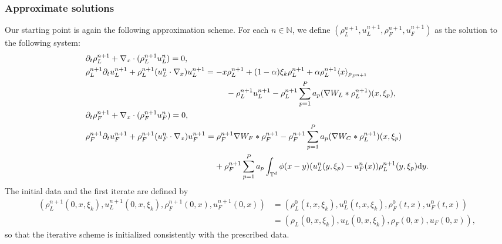\documentclass[10pt, reqno]{amsart}
\theoremstyle{definition}
\theoremstyle{remark}
\numberwithin{equation}{section}
\newcommand{\dy}{\textnormal{d}y}
\newcommand{\bbN}{\mathbb N}
\newcommand{\T}{\mathbb{T}}
\newcommand{\p}{\partial}
\begin{document}
\subsubsection{Approximate solutions} Our starting point is again the following approximation scheme. For each $n\in \bbN$, we define $(\rho_L^{n+1}, u_L^{n+1}, \rho_F^{n+1}, u_F^{n+1})$ as the solution to the following system:    
\begin{align}\label{app_ff}
    \begin{aligned}
      &\p_t \rho^{n+1}_L + \nabla_x\cdot (\rho_L^{n+1} u_L^n) = 0,\\
        &\rho_L^{n+1} \p_t u_L^{n+1} + \rho_L^{n+1} (u_L^n \cdot \nabla_x) u_L^{n+1} = - x \rho_L^{n+1} + (1-\alpha) \xi_k \rho_L^{n+1} + \alpha \rho_L^{n+1}  \langle x \rangle_{\rho_{F^{n+1}}} \\
        &\hspace{6cm} - \rho_L^{n+1} u_L^{n+1} - \rho_L^{n+1} \sum_{p=1}^P a_p (\nabla W_L * \rho_L^{n+1})(x,\xi_p),   \\
             &\p_t \rho_F^{n+1} + \nabla_x\cdot (\rho_F^{n+1} u_F^n) = 0,\\
        &\rho_F^{n+1} \p_t u_F^{n+1} + \rho_F^{n+1} (u_F^n \cdot \nabla_x) u_F^{n+1}   = \rho_F^{n+1} \nabla W_F * \rho_F^{n+1} - \rho_F^{n+1} \sum_{p=1}^P a_p (\nabla W_C * \rho_L^{n+1})(x,\xi_p)    \\
        &\hspace{5.5cm} + \rho_F^{n+1} \sum_{p=1}^P a_p \int_{\T^d} \phi(x-y)(u_L^{n}(y,\xi_p) - u_F^n(x)) \rho_L^{n+1}(y,\xi_p)\dy.   
        \end{aligned}
    \end{align}
The initial data and the first iterate are defined by
    \begin{align*}
        (\rho_L^{n+1}(0,x,\xi_k),u_L^{n+1}(0,x,\xi_k),\rho_F^{n+1}(0,x),u_F^{n+1}(0,x))&= (\rho_L^0(t,x,\xi_k), u_L^0(t,x,\xi_k), \rho_F^0(t,x), u_F^0(t,x)) \\
        &= (\rho_L(0,x,\xi_k), u_L(0,x,\xi_k), \rho_F(0,x), u_F(0,x)),
    \end{align*}
so that the iterative scheme is initialized consistently with the prescribed data.
    
\end{document}
